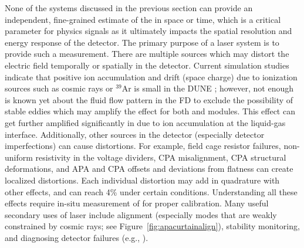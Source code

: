  None of the systems discussed in the previous section can  provide an independent, fine-grained estimate of the \efield in space or time, which is a critical parameter for physics signals as it ultimately impacts the spatial resolution and energy response of the detector. The primary purpose of a laser system is to provide such a measurement. There are multiple sources which may distort the electric field temporally  or spatially in the detector. Current simulation studies indicate that positive ion accumulation and drift (space charge) due to ionization sources such as cosmic rays or ${}^{39}$Ar is small in the DUNE ;  however, not enough is known yet about the fluid flow pattern in the FD to exclude the possibility of stable eddies which may amplify the effect for both \single and \dual modules. This effect can get further amplified significantly in  due to ion accumulation at the liquid-gas interface. 
Additionally, other sources in the detector (especially detector imperfections) can cause \efield distortions. For example, field cage resistor failures, non-uniform resistivity in the voltage dividers, CPA misalignment, CPA structural deformations, and APA and CPA offsets and  deviations from flatness can create localized \efield distortions. Each individual \efield distortion may add in quadrature with other effects, and can reach 4\% under certain conditions. Understanding all these effects require in-situ measurement of \efield for proper calibration. 
Many useful secondary uses of laser include alignment (especially modes that are weakly constrained by cosmic rays; see Figure~\ref{fig:apacurtainalign}), stability monitoring, and diagnosing detector failures (e.g., ).  

